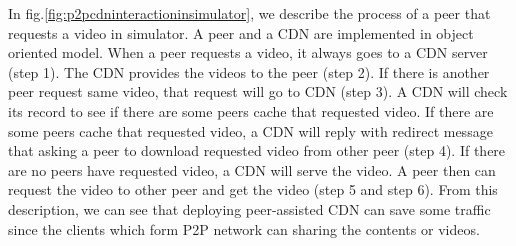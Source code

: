 \documentclass[10pt,final,journal,a4paper]{IEEEtran}
\begin{document}
In fig.\ref{fig:p2pcdninteractioninsimulator}, we describe the process of a peer that requests a video in simulator.
A peer and a CDN are implemented in object oriented model. 
When a peer requests a video, it always goes to a CDN server (step 1). 
The CDN provides the videos to the peer (step 2). 
If there is another peer request same video, that request will go to CDN (step 3).  
A CDN will check its record to see if there are some peers cache that requested video.  
If there are some peers cache that requested video, a CDN will reply with redirect message that asking a peer to download requested video from other peer (step 4).
If there are no peers have requested video, a CDN will serve the video.   
A peer then can request the video to other peer and get the video (step 5 and step 6).
From this description, we can see that deploying peer-assisted CDN can save some traffic since the clients which form P2P network can sharing the contents or videos.
\end{document}
